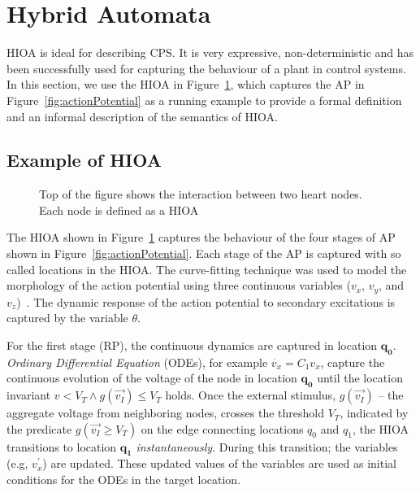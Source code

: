 \section{Hybrid Automata}
\label{sec:HA}


\acf{HIOA} is ideal for describing \ac{CPS}. It is very expressive,
non-deterministic and has been successfully used for capturing the
behaviour of a plant in control systems.  In this section, we use the
\ac{HIOA} in Figure~\ref{fig:heartCellHA}, which captures the \ac{AP} in
Figure~\ref{fig:actionPotential} as a running example to provide a
formal definition and an informal description of the semantics of
\ac{HIOA}.



\subsection{Example of \acf{HIOA} }

\begin{figure}
  \centering
  
  \caption{Top of the figure shows the interaction between two heart nodes. Each node is defined as a \acf{HIOA} \label{fig:heartCellHA}}
\end{figure}

The \ac{HIOA} shown in Figure~\ref{fig:heartCellHA} captures the
behaviour of the four stages of \ac{AP} shown in
Figure~\ref{fig:actionPotential}. Each stage of the \ac{AP} is captured
with so called locations in the \ac{HIOA}. 
The curve-fitting technique was used to model the 
morphology of the action potential using three continuous 
variables ($v_x$, $v_y$, and $v_z$)~\cite{StonyBrookRef}. 
The dynamic response of the action potential to secondary excitations is captured by the variable $\theta$. 

For the first stage
(\ac{RP}), the continuous dynamics are captured in location
$\mathbf{q_0}$. \textit{Ordinary Differential Equation} (ODEs), for
example \mbox{$\dot{v_{x}} = C_{1}v_{x}$}, capture the continuous
evolution of the voltage of the node in location $\mathbf{q_{0}}$ until
the location invariant $v < V_{T} \wedge g(\vec{v_{I}}) \leq V_{T}$
holds. Once the external stimulus, $g(\vec{v_{I}})$ -- the aggregate
voltage from neighboring nodes, crosses the threshold $V_{T}$, indicated
by the predicate \mbox{$g(\vec{v_{I}} \geq V_{T})$} on the edge
connecting locations $q_{0}$ and $q_{1}$, the \ac{HIOA} transitions to
location $\mathbf{q_{1}}$ \textit{instantaneously}. During this
transition; the variables (e.g, $v^{\prime}_{x}$) are updated. These
updated values of the variables are used as initial conditions for the
ODEs in the target location.

